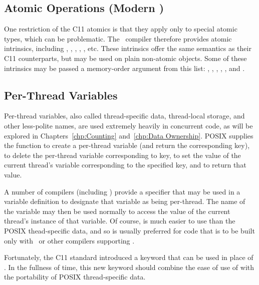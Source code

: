 \subsection{Atomic Operations (Modern \GCC)}
\label{sec:toolsoftrade:Atomic Operations (Modern gcc)}

%
One restriction of the C11 atomics is that they apply only to special
atomic types, which can be problematic.
The \GNUC\ compiler therefore provides atomic intrinsics, including
,
,
,
,
, etc.
These intrinsics offer the same semantics as their C11 counterparts,
but may be used on plain non-atomic objects.
Some of these intrinsics may be passed a memory-order argument from
this list:
,
,
,
,
, and
.

\subsection{Per-Thread Variables}
\label{sec:toolsoftrade:Per-Thread Variables}

Per-thread variables, also called thread-specific data, thread-local
storage, and other less-polite names, are used extremely
heavily in concurrent code, as will be explored in
Chapters~\ref{chp:Counting} and~\ref{chp:Data Ownership}.
POSIX supplies the  function to create a
per-thread variable (and return the corresponding key),
 to delete the per-thread variable corresponding
to key,
 to set the value of the current thread's
variable corresponding to the specified key,
and  to return that value.

A number of compilers (including \GCC) provide a  specifier
that may be used in a variable definition to designate that variable
as being per-thread.
The name of the variable may then be used normally to access the
value of the current thread's instance of that variable.
Of course,  is much easier to use than the POSIX
thead-specific data, and so  is usually preferred for
code that is to be built only with \GCC\ or other compilers supporting
.

Fortunately, the C11 standard introduced a  keyword
that can be used in place of .
In the fullness of time, this new keyword should combine the ease of use
of  with the portability of POSIX thread-specific data.

